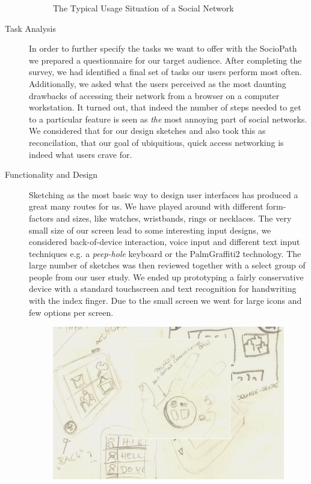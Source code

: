 \begin{description}
\begin{figure}[h]
\begin{center}
  \end{center}
  \caption{The Typical Usage Situation of a Social Network}
  \label{fig:context}
\end{figure}
  \item[Task Analysis]
    In order to further specify the tasks we want to offer with the SocioPath
    we prepared a questionnaire for our target audience. After completing the 
    survey, we had identified a final set of tasks our users perform most often. 
    Additionally, we asked what the users perceived as the most daunting drawbacks
    of accessing their network from a browser on a computer workstation. It turned 
    out, that indeed the number of steps needed to get to a particular feature
    is seen as \emph{the} most annoying part of social networks. We considered 
    that for our design sketches and also took this as reconcilation, that our 
    goal of ubiquitious, quick access networking is indeed what users crave for.
  \item[Functionality and Design]
    Sketching as the most basic way to design user interfaces has produced 
    a great many routes for us. We have played around with different form-factors 
    and sizes, like watches, wristbands, rings or necklaces. The very small 
    size of our screen lead to some interesting input designs, we considered
    back-of-device interaction, voice input and different text input techniques
    e.g. a \emph{peep-hole} keyboard or the Palm\registered Graffiti2\trademark
    technology. The large number of sketches was then reviewed together with a 
    select group of people from our user study. We ended up prototyping a fairly 
    conservative device with a standard touchscreen and text recognition for 
    handwriting with the index finger. Due to the small screen we went for large 
    icons and few options per screen.
\begin{figure}[h]
  \begin{center}
    \includegraphics[width=0.8\linewidth]{imgs/sketches.png}

\end{center}
\end{figure}
\end{description}
